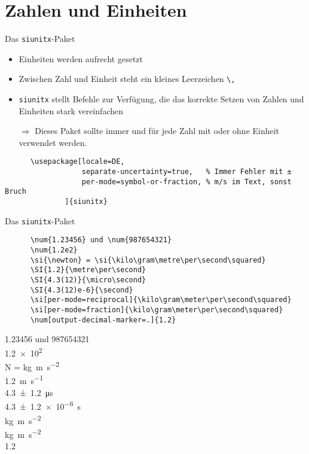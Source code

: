 \section{Zahlen und Einheiten}

\begin{frame}[fragile]{
  Das \texttt{siunitx}-Paket
  \hfill{}
}
\begin{itemize}
    \item Einheiten werden aufrecht gesetzt
    \item Zwischen Zahl und Einheit steht ein kleines Leerzeichen \verb+\,+
    \item \texttt{siunitx} stellt Befehle zur Verfügung, die das korrekte Setzen von Zahlen und Einheiten stark vereinfachen
    \item[$\Rightarrow$] Dieses Paket sollte immer und für jede Zahl mit oder ohne Einheit verwendet werden.
\end{itemize}
  \begin{Packages}
    \begin{lstlisting}
      \usepackage[locale=DE,
                  separate-uncertainty=true,   % Immer Fehler mit ±
                  per-mode=symbol-or-fraction, % m/s im Text, sonst Bruch
              ]{siunitx}
    \end{lstlisting}
  \end{Packages}
\end{frame}

\begin{frame}[fragile]{Das \texttt{siunitx}-Paket}
  \begin{CodeExample}{0.60}
    \begin{lstlisting}
      \num{1.23456} und \num{987654321}
      \num{1.2e2}
      \si{\newton} = \si{\kilo\gram\metre\per\second\squared}
      \SI{1.2}{\metre\per\second}
      \SI{4.3(12)}{\micro\second}
      \SI{4.3(12)e-6}{\second}
      \si[per-mode=reciprocal]{\kilo\gram\meter\per\second\squared}
      \si[per-mode=fraction]{\kilo\gram\meter\per\second\squared}
      \num[output-decimal-marker=.]{1.2}
    \end{lstlisting}
  \CodeResult
    \num{1.23456} und \num{987654321} \\
    \num{1.2e2} \\
    \smallbreak
    \si{\newton} = \si{\kilo\gram\metre\per\second\squared} \\
    \medbreak
    \SI{1.2}{\metre\per\second} \\
    \SI{4.3(12)}{\micro\second} \\
    \SI{4.3(12)e-6}{\second} \\
    \si[per-mode=reciprocal]{\kilo\gram\meter\per\second\squared} \\[\baselineskip]
    \si[per-mode=fraction]{\kilo\gram\meter\per\second\squared} \\[\baselineskip]
    \num[output-decimal-marker=.]{1.2}
  \end{CodeExample}
\end{frame}
